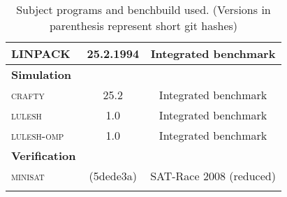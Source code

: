 \begin{longtable}{lcC}
    \textsc{LINPACK}                  & 25.2.1994               & Integrated benchmark\\
    \midrule
    \textbf{Simulation}\\
    \textsc{crafty}                   & 25.2                    & Integrated benchmark\\
    \textsc{lulesh}                   & 1.0                     & Integrated benchmark\\
    \textsc{lulesh-omp}               & 1.0                     & Integrated benchmark\\
    \midrule
    \textbf{Verification}\\
    \textsc{minisat}                  & (5dede3a)               & SAT-Race 2008 (reduced)\\
    \bottomrule
    \caption[Subject programs]{Subject programs and benchbuild used. (Versions in parenthesis represent short git hashes)}
    \label{tab:subjectPrograms}
\end{longtable}
